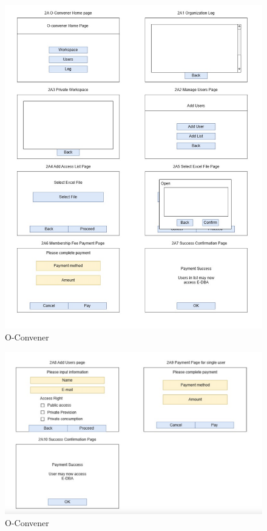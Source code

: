 \documentclass[a4paper,12pt]{article}
\begin{document}
\begin{figure}[H]
    \begin{center}
        \includegraphics[width=\textwidth]{picture/截屏2025-03-12 11.17.07.png}
        \caption{O-Convener}
        \label{fig:register-organization}
    \end{center}
\end{figure}

\begin{figure}[H]
    \begin{center}
        \includegraphics[width=\textwidth]{picture/截屏2025-03-12 11.16.57.png}
        \caption{O-Convener}
        \label{fig:register-organization}
    \end{center}
\end{figure}
\end{document}
